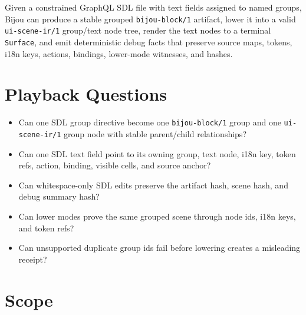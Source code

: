 Given a constrained GraphQL SDL file with text fields assigned to named groups, Bijou can produce a stable grouped \texttt{b\allowbreak{}i\allowbreak{}j\allowbreak{}o\allowbreak{}u\allowbreak{}-\allowbreak{}b\allowbreak{}l\allowbreak{}o\allowbreak{}c\allowbreak{}k\allowbreak{}/\allowbreak{}1} artifact, lower it into a valid \texttt{u\allowbreak{}i\allowbreak{}-\allowbreak{}s\allowbreak{}c\allowbreak{}e\allowbreak{}n\allowbreak{}e\allowbreak{}-\allowbreak{}i\allowbreak{}r\allowbreak{}/\allowbreak{}1} group/text node tree, render the text nodes to a terminal \texttt{S\allowbreak{}u\allowbreak{}r\allowbreak{}f\allowbreak{}a\allowbreak{}c\allowbreak{}e}, and emit deterministic debug facts that preserve source maps, tokens, i18n keys, actions, bindings, lower-mode witnesses, and hashes.

\section{Playback Questions}\label{record-141-playback-questions}

\begin{itemize}
\tightlist
\item
  Can one SDL group directive become one \texttt{b\allowbreak{}i\allowbreak{}j\allowbreak{}o\allowbreak{}u\allowbreak{}-\allowbreak{}b\allowbreak{}l\allowbreak{}o\allowbreak{}c\allowbreak{}k\allowbreak{}/\allowbreak{}1} group and one \texttt{u\allowbreak{}i\allowbreak{}-\allowbreak{}s\allowbreak{}c\allowbreak{}e\allowbreak{}n\allowbreak{}e\allowbreak{}-\allowbreak{}i\allowbreak{}r\allowbreak{}/\allowbreak{}1} group node with stable parent/child relationships?
\item
  Can one SDL text field point to its owning group, text node, i18n key, token refs, action, binding, visible cells, and source anchor?
\item
  Can whitespace-only SDL edits preserve the artifact hash, scene hash, and debug summary hash?
\item
  Can lower modes prove the same grouped scene through node ids, i18n keys, and token refs?
\item
  Can unsupported duplicate group ids fail before lowering creates a misleading receipt?
\end{itemize}

\section{Scope}\label{record-141-scope}

